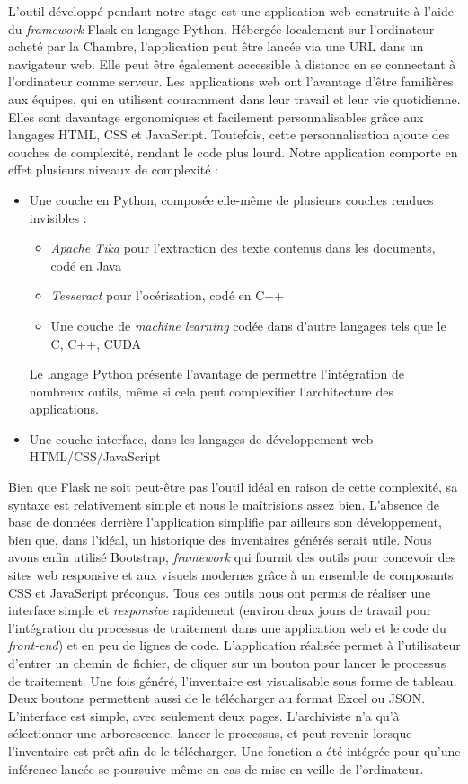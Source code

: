 L'outil développé pendant notre stage est une application web construite à l'aide du \emph{framework} Flask en langage Python. Hébergée localement sur l'ordinateur acheté par la Chambre, l'application peut être lancée via une URL dans un navigateur web. Elle peut être également accessible à distance en se connectant à l'ordinateur comme serveur. Les applications web ont l'avantage d'être familières aux équipes, qui en utilisent couramment dans leur travail et leur vie quotidienne. Elles sont davantage ergonomiques et facilement personnalisables grâce aux langages HTML, CSS et JavaScript. Toutefois, cette personnalisation ajoute des couches de complexité, rendant le code plus lourd. Notre application comporte en effet plusieurs niveaux de complexité :
\begin{itemize}[label=\textbullet]
	\item Une couche en Python, composée elle-même de plusieurs couches rendues invisibles :
		\begin{itemize}[label=\textopenbullet]
		 	\item \emph{Apache Tika} pour l'extraction des texte contenus dans les documents, codé en Java
		 	\item \emph{Tesseract} pour l'océrisation, codé en C++
		 	\item Une couche de \emph{machine learning} codée dans d'autre langages tels que le C, C++, CUDA
		\end{itemize}
	
	Le langage Python présente l’avantage de permettre l’intégration de nombreux outils, même si cela peut complexifier l'architecture des applications.
	\item Une couche interface, dans les langages de développement web HTML/CSS/JavaScript
\end{itemize}
Bien que Flask ne soit peut-être pas l'outil idéal en raison de cette complexité, sa syntaxe est relativement simple et nous le maîtrisions assez bien.
L'absence de base de données derrière l’application simplifie par ailleurs son développement, bien que, dans l’idéal, un historique des inventaires générés serait utile. Nous avons enfin utilisé Bootstrap, \emph{framework} qui fournit des outils pour concevoir des sites web \gls{responsive} et aux visuels modernes grâce à un ensemble de composants CSS et JavaScript préconçus. Tous ces outils nous ont permis de réaliser une interface simple et \emph{responsive} rapidement (environ deux jours de travail pour l'intégration du processus de traitement dans une application web et le code du \emph{front-end}) et en peu de lignes de code. 
L'application réalisée permet à l’utilisateur d’entrer un chemin de fichier, de cliquer sur un bouton pour lancer le processus de traitement. Une fois généré, l'inventaire est visualisable sous forme de tableau. Deux boutons permettent aussi de le télécharger au format Excel ou JSON. L'interface est simple, avec seulement deux pages. L'archiviste n'a qu'à sélectionner une arborescence, lancer le processus, et peut revenir lorsque l’inventaire est prêt afin de le télécharger. Une fonction a été intégrée pour qu'une inférence lancée se poursuive même en cas de mise en veille de l'ordinateur.



